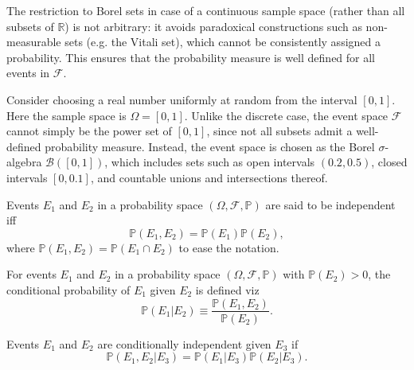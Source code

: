 \begin{remark}
	The restriction to Borel sets in case of a continuous sample space (rather than all subsets of $\mathbb{R}$) is not arbitrary: it avoids paradoxical constructions such as non-measurable sets (e.g. the Vitali set), which cannot be consistently assigned a probability. This ensures that the probability measure is well defined for all events in $\mathcal{F}$.
\end{remark}

\begin{example}
	Consider choosing a real number uniformly at random from the interval $[0,1]$. Here the sample space is $\Omega = [0,1]$. Unlike the discrete case, the event space $\mathcal{F}$ cannot simply be the power set of $[0,1]$, since not all subsets admit a well-defined probability measure. Instead, the event space is chosen as the Borel $\sigma$-algebra $\mathcal{B}([0,1])$, which includes sets such as open intervals $(0.2, 0.5)$, closed intervals $[0, 0.1]$, and countable unions and intersections thereof.
\end{example}


\begin{definition}[Independence]
	\label{def:independence}
	Events $E_1$ and $E_2$  in a probability space $(\Omega, \mathcal{F}, \mathbb{P})$ are said to be independent iff
	\begin{equation}
		\mathbb{P}(E_1,E_2) = \mathbb{P}(E_1) \mathbb{P}(E_2),
		\label{eq:ind}
	\end{equation}
	where $\mathbb{P}(E_1,E_2)= \mathbb{P}(E_1\cap E_2)$ to ease the notation.
\end{definition}

\begin{definition}
	\label{def:conditional_probability}
	For events $E_1$ and $E_2$ in a probability space $(\Omega, \mathcal{F}, \mathbb{P})$ with $\mathbb{P}(E_2) > 0$, the conditional probability of $E_1$ given $E_2$ is defined viz
	\begin{equation}
		\mathbb{P}(E_1|E_2) \equiv \frac{\mathbb{P}(E_1, E_2)}{\mathbb{P}(E_2)}.
		\label{eq:cond}
	\end{equation}
\end{definition}

\begin{definition}
\label{def:conditional_independence}
Events $E_1$ and $E_2$ are conditionally independent given $E_3$ if
\begin{equation}
\mathbb{P}(E_1, E_2 | E_3) = \mathbb{P}(E_1|E_3)\mathbb{P}(E_2|E_3).
\end{equation}
\end{definition}

